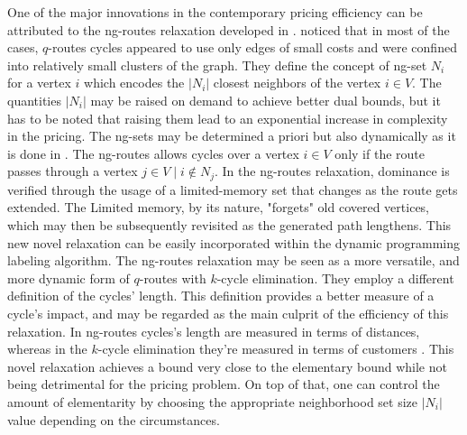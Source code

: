 One of the major innovations in the contemporary pricing efficiency
can be attributed to the ng-routes relaxation developed in \textcite{baldacci2011}.
\citeauthor{baldacci2011} noticed that in most of the cases,
$q$-routes cycles appeared to use only edges of small costs
and were confined into relatively small clusters of the graph.
They define the concept of ng-set $N_i$ for a vertex $i$
which encodes the $|N_i|$ closest neighbors of the vertex $i \in V$.
The quantities $|N_i|$ may be raised on demand to achieve better dual bounds,
but it has to be noted that raising them lead to an exponential increase in complexity
in the pricing.
The ng-sets may be determined a priori but also dynamically as it is done in \textcite{roberti2014}.
The ng-routes allows cycles over a vertex $i \in V$ only if the route
passes through a vertex $j \in V \mid i \notin N_j$.
In the ng-routes relaxation,
dominance is verified through the usage of a limited-memory set
that changes as the route gets extended.
The Limited memory, by its nature,
"forgets" old covered vertices,
which may then be subsequently revisited
as the generated path lengthens.
This new novel relaxation can be easily incorporated within the
dynamic programming labeling algorithm.
The ng-routes relaxation may be seen
as a more versatile, and more dynamic form of $q$-routes
with $k$-cycle elimination.
They employ a different definition of the cycles' length.
This definition provides a better measure of a cycle's impact,
and may be regarded as the main culprit of the efficiency of
this relaxation.
In ng-routes cycles's length are measured in terms of distances,
whereas in the $k$-cycle elimination they're measured
in terms of customers \parencite{contardo2014}.
This novel relaxation achieves a bound very close to the elementary bound while
not being detrimental for the pricing problem.
On top of that, one can control
the amount of elementarity by choosing the appropriate neighborhood set size $|N_i|$
value  depending on the circumstances.

